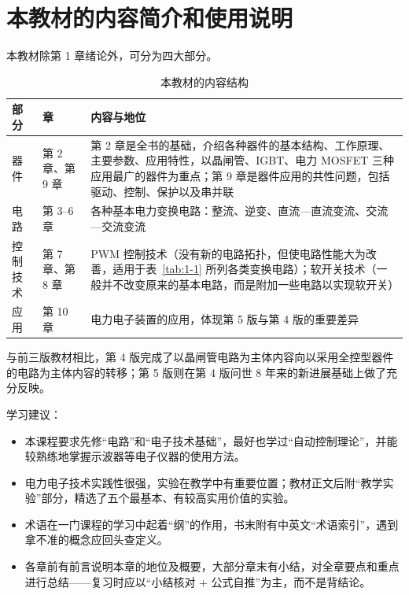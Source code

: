 
\section{本教材的内容简介和使用说明}

本教材除第 1 章绪论外，可分为四大部分。

\begin{table}[htbp]
\centering
\caption{本教材的内容结构}
\label{tab:1-3}
\begin{tabular}{p{3.4cm}p{2.2cm}p{8.0cm}}
\toprule
\textbf{部分} & \textbf{章} & \textbf{内容与地位} \\
\midrule
器件 & 第 2 章、第 9 章 & 第 2 章是全书的基础，介绍各种器件的基本结构、工作原理、主要参数、应用特性，以晶闸管、IGBT、电力 MOSFET 三种应用最广的器件为重点；第 9 章是器件应用的共性问题，包括驱动、控制、保护以及串并联 \\
电路 & 第 3--6 章 & 各种基本电力变换电路：整流、逆变、直流—直流变流、交流—交流变流 \\
控制技术 & 第 7 章、第 8 章 & PWM 控制技术（没有新的电路拓扑，但使电路性能大为改善，适用于表~\ref{tab:1-1} 所列各类变换电路）；软开关技术（一般并不改变原来的基本电路，而是附加一些电路以实现软开关） \\
应用 & 第 10 章 & 电力电子装置的应用，体现第 5 版与第 4 版的重要差异 \\
\bottomrule
\end{tabular}
\end{table}

与前三版教材相比，第 4 版完成了以晶闸管电路为主体内容向以采用全控型器件的电路为主体内容的转移；第 5 版则在第 4 版问世 8 年来的新进展基础上做了充分反映。

学习建议：

\begin{itemize}
  \item 本课程要求先修“电路”和“电子技术基础”，最好也学过“自动控制理论”，并能较熟练地掌握示波器等电子仪器的使用方法。
  \item 电力电子技术实践性很强，实验在教学中有重要位置；教材正文后附“教学实验”部分，精选了五个最基本、有较高实用价值的实验。
  \item 术语在一门课程的学习中起着“纲”的作用，书末附有中英文“术语索引”，遇到拿不准的概念应回头查定义。
  \item 各章前有前言说明本章的地位及概要，大部分章末有小结，对全章要点和重点进行总结——复习时应以“小结核对 + 公式自推”为主，而不是背结论。
\end{itemize}


